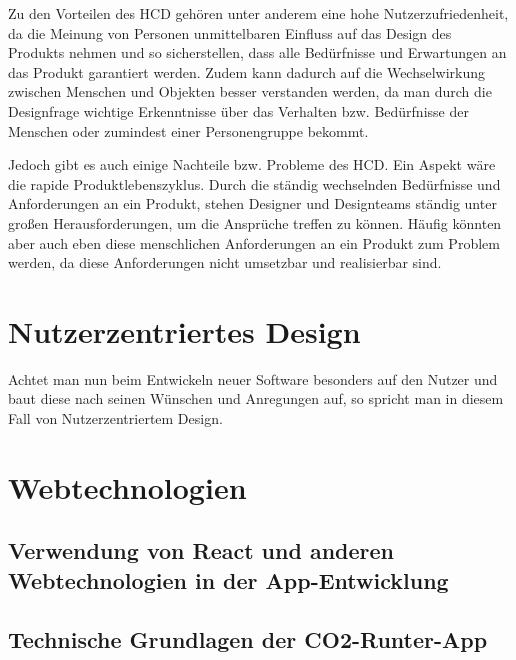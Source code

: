 Zu den Vorteilen des HCD gehören unter anderem eine hohe Nutzerzufriedenheit, da die Meinung von Personen unmittelbaren Einfluss auf das Design des Produkts nehmen und so sicherstellen, dass alle Bedürfnisse und Erwartungen an das Produkt garantiert werden. Zudem kann dadurch auf die Wechselwirkung zwischen Menschen und Objekten besser verstanden werden, da man durch die Designfrage wichtige Erkenntnisse über das Verhalten bzw. Bedürfnisse der Menschen oder zumindest einer Personengruppe bekommt.

Jedoch gibt es auch einige Nachteile bzw. Probleme des HCD. Ein Aspekt wäre die rapide Produktlebenszyklus. Durch die ständig wechselnden Bedürfnisse und Anforderungen an ein Produkt, stehen Designer und Designteams ständig unter großen Herausforderungen, um die Ansprüche treffen zu können. Häufig könnten aber auch eben diese menschlichen Anforderungen an ein Produkt zum Problem werden, da diese Anforderungen nicht umsetzbar und realisierbar sind.




\section{Nutzerzentriertes Design}
Achtet man nun beim Entwickeln neuer Software besonders auf den Nutzer und baut diese nach seinen Wünschen und Anregungen auf, so spricht man in diesem Fall von Nutzerzentriertem Design.

\section{Webtechnologien}

\subsection{Verwendung von React und anderen Webtechnologien in der App-Entwicklung}

\subsection{Technische Grundlagen der CO2-Runter-App}
